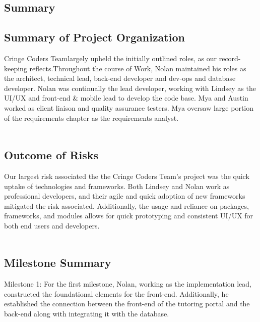 \documentclass[oneside,openany,obeyspaces]{book}
\newcommand\tab[1][1cm]{\hspace*{#1}}
\newcommand\TeamName{Cringe Coders Team}
\begin{document}
\begin{flushleft}
    \chapter{Summary}

    \section{Summary of Project Organization}

    \tab \TeamName largely upheld the initially outlined roles, as our record-keeping reflects.Throughout the course of Work, Nolan maintained his roles as  the architect, technical lead, back-end developer and dev-ops and database developer. Nolan was continually the lead developer, working with Lindsey as the UI/UX and front-end \& mobile lead to develop the code base. Mya and Austin worked as client liaison and quality assurance testers. Mya oversaw large portion of the requirements chapter as the requirements analyst.\\~\\

    \section{Outcome of Risks}

    \tab Our largest risk associated the the \TeamName's project was the quick uptake of technologies and frameworks. Both Lindsey and Nolan work as professional developers, and their agile and quick adoption of new frameworks mitigated the risk associated. Additionally, the usage and reliance on packages, frameworks, and modules allows for quick prototyping and consistent UI/UX for both end users and developers.\\~\\

    \tab



    \section{Milestone Summary}

    \tab Milestone 1: For the first milestone, Nolan, working as the implementation lead, constructed the foundational elements for the front-end. Additionally, he established the connection between the front-end of the tutoring portal and the back-end along with integrating it with the database.\\~\\


\end{flushleft}
\end{document}
